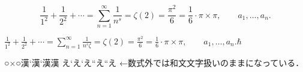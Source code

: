 \documentclass{article}
\begin{document}
\makeatletter

\[
 \frac1{1^2}+\frac1{2^2}+\cdots=
\sum_{n=1}^\infty \frac1{n^s}=\zeta(2)=\frac{\pi^2}{6}
=\frac16\cdot \pi\times\pi,\qquad a_1,\dots,a_n.
\]

$
 \frac1{1^2}+\frac1{2^2}+\cdots=
\sum_{n=1}^\infty \frac1{n^s\zeta}=\zeta(2)=\frac{\pi^2}{6}
=\frac16\cdot \pi\times\pi,\qquad a_1,\dots,a_n. \hbar
$

{\tt\meaning\sum}


○×○漢\ltjjachar`\×漢\ltjalchar`\×漢\times 漢
え\ltjjachar`\“え\ltjalchar`\“え\textquotedblleft え“え
←数式外では和文文字扱いのままになっている．
\end{document}
